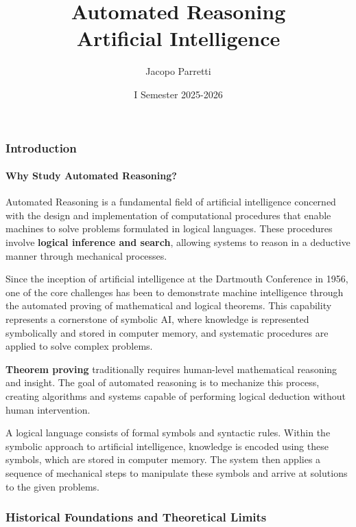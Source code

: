 \documentclass[11pt,a4paper]{article}
\title{\textbf{Automated Reasoning}\\
\large Artificial Intelligence}
\author{Jacopo Parretti}
\date{I Semester 2025-2026}
\theoremstyle{definition}
\theoremstyle{plain}
\theoremstyle{remark}
\begin{document}
\maketitle
\newpage
\tableofcontents
\newpage

\part{}


\section{Introduction}

\subsection{Why Study Automated Reasoning?}

Automated Reasoning is a fundamental field of artificial intelligence concerned with the design and implementation of computational procedures that enable machines to solve problems formulated in logical languages. These procedures involve \textbf{logical inference and search}, allowing systems to reason in a deductive manner through mechanical processes.

Since the inception of artificial intelligence at the Dartmouth Conference in 1956, one of the core challenges has been to demonstrate machine intelligence through the automated proving of mathematical and logical theorems. This capability represents a cornerstone of symbolic AI, where knowledge is represented symbolically and stored in computer memory, and systematic procedures are applied to solve complex problems.

\textbf{Theorem proving} traditionally requires human-level mathematical reasoning and insight. The goal of automated reasoning is to mechanize this process, creating algorithms and systems capable of performing logical deduction without human intervention.

A logical language consists of formal symbols and syntactic rules. Within the symbolic approach to artificial intelligence, knowledge is encoded using these symbols, which are stored in computer memory. The system then applies a sequence of mechanical steps to manipulate these symbols and arrive at solutions to the given problems.



\newpage

\section{Historical Foundations and Theoretical Limits}
\end{document}
